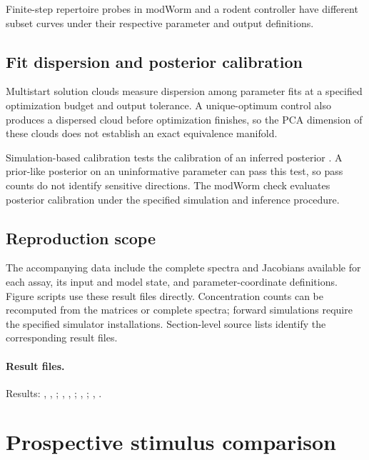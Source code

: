 \documentclass[11pt,letterpaper]{article}
\begin{document}
Finite-step repertoire probes in modWorm and a rodent controller have different subset curves under their respective parameter and output definitions.

\subsection{Fit dispersion and posterior calibration}
Multistart solution clouds measure dispersion among parameter fits at a specified optimization budget and output tolerance. A unique-optimum control also produces a dispersed cloud before optimization finishes, so the PCA dimension of these clouds does not establish an exact equivalence manifold.

Simulation-based calibration tests the calibration of an inferred posterior \citep{talts2018validating,hermans2022sbc}. A prior-like posterior on an uninformative parameter can pass this test, so pass counts do not identify sensitive directions. The modWorm check evaluates posterior calibration under the specified simulation and inference procedure.

\subsection{Reproduction scope}
The accompanying data include the complete spectra and Jacobians available for each assay, its input and model state, and parameter-coordinate definitions. Figure scripts use these result files directly. Concentration counts can be recomputed from the matrices or complete spectra; forward simulations require the specified simulator installations. Section-level source lists identify the corresponding result files.

\paragraph{Result files.}
Results: , , ; , , ; , ; , .

\section{Prospective stimulus comparison}\label{sec:prospective}
\end{document}

